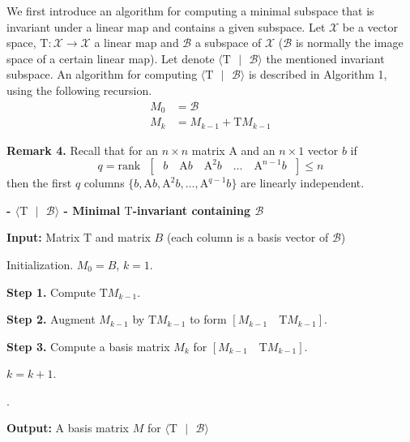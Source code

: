 \documentclass[11pt,a4paper]{article}
\begin{document}
We first introduce an algorithm for computing a minimal subspace that is invariant under a linear map and contains a given subspace. Let $\mathcal{X}$ be a vector space, $\mathrm{T} : \mathcal{X} \rightarrow \mathcal{X} $ a linear map and $\mathcal{B}$ a subspace of $\mathcal{X}$ ($\mathcal{B}$ is normally the image space of a certain linear map). Let denote $\langle \mathrm{T} \text{ }| \text{ } \mathcal{B} \rangle$ the mentioned invariant subspace. An algorithm for computing $\langle \mathrm{T} \text{ }| \text{ } \mathcal{B} \rangle$ is described in Algorithm 1, using the following recursion.
\begin{align*}
M_0 &= \mathcal{B} \\
M_k &= M_{k-1} + \mathrm{T}M_{k-1}
\end{align*}

\textbf{Remark 4.} Recall that for an $n \times n$ matrix $\mathrm{A}$ and an $n \times 1$ vector $b$ if 
$$
q = \mathrm{rank} \text{ } [\text{ } b \quad \mathrm{A}b \quad \mathrm{A}^2b \quad \dots \quad \mathrm{A}^{n-1}b \text{ }] \leq n
$$
then the first $q$ columns $\{ b, \mathrm{A}b, \mathrm{A}^2b, \dots, \mathrm{A}^{q-1}b \}$ are linearly independent.\\

\begin{algorithm}
\caption{\textbf{- $\langle \mathrm{T} \text{ }| \text{ } \mathcal{B} \rangle$ - Minimal $\mathrm{T}$-invariant containing $\mathcal{B}$}}
\begin{algorithmic}
\State \textbf{Input:} Matrix $\mathrm{T}$ and matrix $B$ (each column is a basis vector of $\mathcal{B}$)

\State \quad Initialization. $M_0 = B$, $k =1$.

\Repeat 

\State \quad \textbf{Step 1.} Compute $\mathrm{T}M_{k-1}$.
	             
\State \quad \textbf{Step 2.} Augment $M_{k-1}$ by $\mathrm{T}M_{k-1}$ to form $[M_{k-1} \quad \mathrm{T}M_{k-1}]$.

\State \quad \textbf{Step 3.} Compute a basis matrix $M_k$ for $[M_{k-1} \quad \mathrm{T}M_{k-1}]$.

\State \quad $k = k+1$.

.

\State \textbf{Output:} A basis matrix $M$ for $\langle \mathrm{T} \text{ }| \text{ } \mathcal{B} \rangle$ 
\end{algorithmic}
\end{algorithm}
%
%
\end{document}
